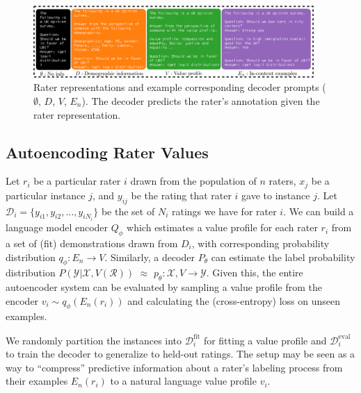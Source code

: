 \documentclass[11pt]{article}
\begin{document}
\begin{figure}[t]
\centering
\includegraphics[width=0.95\textwidth]{files/raterreplarge-cropped.pdf}
\vspace{-5pt}
\caption{Rater representations and example corresponding decoder prompts
($\emptyset$, $D$, $V$, $E_n$).
The decoder predicts the rater's annotation given the rater representation.
}
\label{fig:raterrep}
\vspace{-2pt}
\end{figure}

\subsection{Autoencoding Rater Values}
\label{sec:autoencoder}

Let $r_i$ be a particular rater $i$ drawn from the population of $n$ raters, $x_j$ be a particular instance $j$, and $y_{ij}$ be the rating that rater $i$ gave to instance $j$. Let $\mathcal{D}_i = \{y_{i1}, y_{i2}, \ldots, y_{iN_i}\}$ be the set of $N_i$ ratings we have for rater $i$. We can build a language model encoder $Q_\phi$ which estimates a value profile for each rater $r_i$ from a set of (fit) demonstrations drawn from $D_i$, with corresponding probability distribution $q_\phi: E_n \to V$. Similarly, a decoder $P_\theta$ can estimate the label probability distribution $P(\mathcal{Y}|\mathcal{X},V(\mathcal{R}))$ $\approx$ $p_\theta: \mathcal{X}, V \to \mathcal{Y}$. Given this, the entire autoencoder system can be evaluated by sampling a value profile from the encoder $v_i \sim q_\phi(E_n(r_i))$ and calculating the (cross-entropy) loss on unseen examples.

We randomly partition the instances into $\mathcal{D}_i^{\text{fit}}$ for fitting a value profile and $\mathcal{D}_i^{\text{eval}}$
to train the decoder to generalize to held-out ratings. The setup may be seen as a way to ``compress'' predictive information about a rater's labeling process from their examples $E_n(r_i)$ to a natural language value profile $v_i$.
\end{document}
